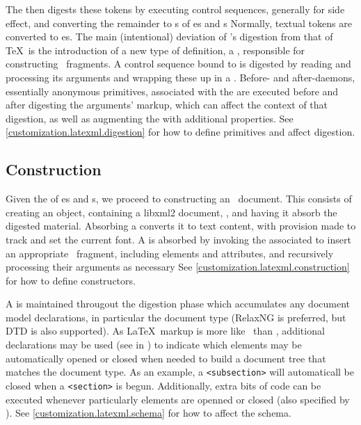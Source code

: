 \documentclass{book}
\begin{document}
The  then digests these tokens by executing  control 
sequences, generally for side effect, and converting the remainder
to s of es and s
Normally, textual tokens are converted to es.
The main (intentional) deviation of \LaTeXML's digestion from that of \TeX\ is
the introduction of a new type of definition, a ,
responsible for constructing \XML\ fragments.
A control sequence bound to  is digested by
reading and processing its arguments and wrapping these up in a .
Before- and after-daemons, essentially anonymous primitives, associated with
the  are executed before and after digesting the 
arguments' markup, which can affect the context of that digestion, as well
as augmenting the  with additional properties.
See \ref{customization.latexml.digestion} for how to define primitives
and affect digestion.


\subsection{Construction}\label{architecture.construction}
%
%
%
Given the  of es and s,
we proceed to constructing an \XML\ document.
This consists of creating an  object, containing
a libxml2 document, , and having it absorb the digested
material. Absorbing a  converts it to text content, with provision
made to track and set the current font.
A  is absorbed by invoking the associated 
to insert an appropriate \XML\ fragment, including elements and attributes,
and recursively processing their arguments as necessary
See \ref{customization.latexml.construction} for how to define
constructors.

A  is maintained througout the digestion phase which accumulates
any document model declarations, in particular the document type (RelaxNG is
preferred, but DTD is also supported).  As \LaTeX\ markup is more
like \SGML\ than \XML, additional declarations may be used (see  in )
to indicate which elements may
be automatically opened or closed when needed to build a document tree that matches
the document type.  As an example, a \verb|<subsection>| will automaticall be closed
when a \verb|<section>| is begun.  Additionally, extra bits of code can
be executed whenever particularly elements are openned or closed (also
specified by ).
See \ref{customization.latexml.schema} for how to affect the schema.
\end{document}

